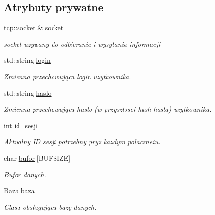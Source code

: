 \subsection*{Atrybuty prywatne}
\begin{CompactItemize}
\item 
tcp::socket \& \hyperlink{a00005_835f5d6b548278a3e00d2c423336e903}{socket}
\begin{CompactList}\small\item\em socket uzywany do odbierania i wysyłania informacji \item\end{CompactList}\item 
std::string \hyperlink{a00005_8bb124a2f285074773d1b0ee62cf0cc0}{login}
\begin{CompactList}\small\item\em Zmienna przechowująca login uzytkownika. \item\end{CompactList}\item 
std::string \hyperlink{a00005_2fc04d16e2ba688c5b306a2ad6770039}{haslo}
\begin{CompactList}\small\item\em Zmienna przechowująca haslo (w przyszlosci hash hasla) uzytkownika. \item\end{CompactList}\item 
int \hyperlink{a00005_aa8407d10d299b524fa2f74532e537ac}{id\_\-sesji}
\begin{CompactList}\small\item\em Aktualny ID sesji potrzebny pryz kazdym polaczneiu. \item\end{CompactList}\item 
char \hyperlink{a00005_2e7575bebca6d0fd9f5a8bfe6fc652d0}{bufor} \mbox{[}BUFSIZE\mbox{]}
\begin{CompactList}\small\item\em Bufor danych. \item\end{CompactList}\item 
\hyperlink{a00001}{Baza} \hyperlink{a00005_21b4b313249353e48f7ea67f534ee519}{baza}
\begin{CompactList}\small\item\em Clasa obsługująca bazę danych. \item\end{CompactList}\end{CompactItemize}


